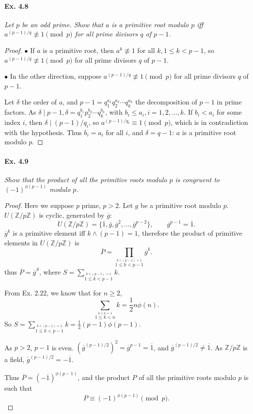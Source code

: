 \documentclass[11pt,a4paper]{article}
\newcommand{\Z}{\mathbb{Z}}
\begin{document}
\paragraph{Ex. 4.8}

{\it  Let $p$ be an odd prime. Show that $a$ is a primitive root modulo $p$ iff $a^{(p-1)/q} \not \equiv 1 \pmod p$ for all prime divisors $q$ of $p - 1$.
}

\begin{proof}
$\bullet$ If $a$ is a primitive root, then $a^k \not \equiv 1$ for all $k, 1\leq k < p-1$, so $a^{(p-1)/q} \not \equiv 1 \pmod p$ for all prime divisors $q$ of $p - 1$.

$\bullet$ In the other direction, suppose $a^{(p-1)/q} \not \equiv 1 \pmod p$ for all prime divisors $q$ of $p - 1$.

Let $\delta$ the order of $a$, and $p-1 = q_1^{a_1}q_2^{a_2}\cdots q_k^{a_k}$ the decomposition of $p-1$ in prime factors. As $\delta \mid p-1, \delta = q_1^{b_1}p_2^{b_2}\cdots q_k^{b_k}$, with $b_i \leq a_i, i=1,2,\ldots,k$. If $b_i < a_i$ for some index $i$, then $\delta \mid (p-1)/q_i$, so $a^{(p-1)/q_i} \equiv 1 \pmod p$, which is in contradiction with the hypothesis. Thus $b_i = a_i$ for all $i$, and $\delta = q-1$: $a$ is a primitive root modulo $p$.
\end{proof}

\paragraph{Ex. 4.9}

{\it Show that the product of all the primitive roots modulo $p$ is congruent to $(-1)^{\phi(p-1)}$ modulo $p$.
}

\begin{proof} Here we suppose $p$ prime, $p>2$. Let $g$ be a primitive root modulo $p$. $U(\Z/p\Z)$ is cyclic, generated by $\overline{g}$:
$$U(\Z/p\Z) = \{\overline{1},\overline{g}, \overline{g}^2, \ldots,\overline{g}^{p-2}\},\qquad \overline{g}^{p-1} = \overline{1}.$$
$\overline{g}^k$ is a primitive element iff $k \wedge (p-1) = 1$, therefore the product of primitive elements in $U(\Z/p\Z)$ is
$$\overline{P} = \prod_{\overset{k\wedge (p-1) = 1}{ 1\leq k < p-1}} \overline{g}^k.$$
thus $\overline{P} = \overline{g}^S$, where $S = \sum\limits_{\overset{k\wedge (p-1) = 1}{ 1\leq k < p-1}}  k$.

From Ex. 2.22, we know that for $n\geq 2$,
$$\sum_{\overset{k\wedge n = 1}{ 1\leq k < n}}  k = \frac{1}{2} n \phi(n).$$
So $S = \sum\limits_{\overset{k\wedge (p-1) = 1}{ 1\leq k < p-1}}  k = \frac{1}{2} (p-1) \phi(p-1)$.

As $p>2$, $p-1$ is even. $(\overline{g}^{(p-1)/2})^2 = \overline{g}^{p-1} = \overline{1}$, and $\overline{g}^{(p-1)/2} \ne \overline{1}$. As $\Z/p\Z$ is a field, $\overline{g}^{(p-1)/2} = -\overline{1}$.

Thus $\overline{P} = (-\overline{1})^{\phi(p-1)}$, and the product $P$ of all the primitive roots modulo $p$ is such that
$$P \equiv  (-1)^{\phi(p-1)} \pmod p.$$
\end{proof}
\end{document}
